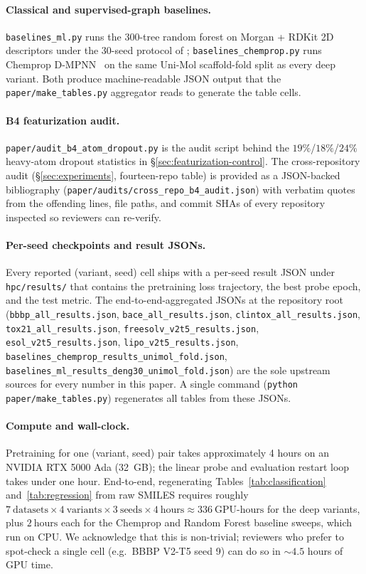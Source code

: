 \paragraph{Classical and supervised-graph baselines.}
\texttt{baselines\_ml.py} runs the 300-tree random forest on Morgan +
RDKit 2D descriptors under the 30-seed protocol of
\citet{deng2023systematic}; \texttt{baselines\_chemprop.py} runs Chemprop
D-MPNN~\cite{yang2019chemprop} on the same Uni-Mol scaffold-fold split as
every deep variant. Both produce machine-readable JSON output that the
\texttt{paper/make\_tables.py} aggregator reads to generate the table
cells.

\paragraph{B4 featurization audit.}
\texttt{paper/audit\_b4\_atom\_dropout.py} is the audit script behind the
$19\%$/$18\%$/$24\%$ heavy-atom dropout statistics in
\S\ref{sec:featurization-control}. The cross-repository audit
(\S\ref{sec:experiments}, fourteen-repo table) is provided as a
JSON-backed bibliography
(\texttt{paper/audits/cross\_repo\_b4\_audit.json}) with verbatim quotes
from the offending lines, file paths, and commit SHAs of every repository
inspected so reviewers can re-verify.

\paragraph{Per-seed checkpoints and result JSONs.}
Every reported (variant, seed) cell ships with a per-seed result JSON
under \texttt{hpc/results/} that contains the pretraining loss
trajectory, the best probe epoch, and the test metric. The
end-to-end-aggregated JSONs at the repository root
(\texttt{bbbp\_all\_results.json}, \texttt{bace\_all\_results.json},
\texttt{clintox\_all\_results.json}, \texttt{tox21\_all\_results.json},
\texttt{freesolv\_v2t5\_results.json},
\texttt{esol\_v2t5\_results.json}, \texttt{lipo\_v2t5\_results.json},
\texttt{baselines\_chemprop\_results\_unimol\_fold.json},
\texttt{baselines\_ml\_results\_deng30\_unimol\_fold.json}) are the sole
upstream sources for every number in this paper. A single command
(\texttt{python paper/make\_tables.py}) regenerates all tables from these
JSONs.

\paragraph{Compute and wall-clock.} Pretraining for one (variant, seed)
pair takes approximately 4 hours on an NVIDIA RTX 5000 Ada (32~GB);
the linear probe and evaluation restart loop takes under one hour.
End-to-end, regenerating Tables~\ref{tab:classification}
and~\ref{tab:regression} from raw SMILES requires roughly
$7~\text{datasets} \times 4~\text{variants} \times 3~\text{seeds} \times
4~\text{hours} \approx 336~\text{GPU-hours}$ for the deep variants, plus
$2~\text{hours}$ each for the Chemprop and Random Forest baseline sweeps,
which run on CPU. We acknowledge that this is non-trivial; reviewers who
prefer to spot-check a single cell (e.g.\ BBBP V2-T5 seed 9) can do so in
$\sim 4.5$ hours of GPU time.
